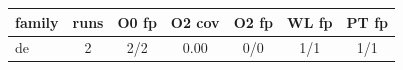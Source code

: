 \begin{tabular}{lcccccc}
\toprule
family & runs & O0 fp & O2 cov & O2 fp & WL fp & PT fp \\
\midrule
de & 2 & 2/2 & 0.00 & 0/0 & 1/1 & 1/1 \\
\bottomrule
\end{tabular}
